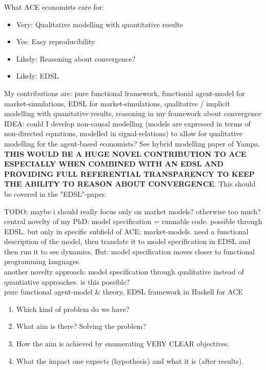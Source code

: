 What ACE economists care for:

\begin{itemize}
\item Very: Qualitative modelling with quantitative results
\item Yes: Easy reproducibility
\item Likely: Reasoning about convergence?
\item Likely: EDSL
\end{itemize}

My contributions are: pure functional framework, functional agent-model for market-simulations, EDSL for market-simulations, qualitative / implicit modelling with quanitative results, reasoning in my framework about convergence \\

IDEA: could I develop non-causal modelling (models are expressed in terms of non-directed equations, modelled in signal-relations) to allow for qualitative modelling for the agent-based economists? See hybrid modelling paper of Yampa. \textbf{THIS WOULD BE A HUGE NOVEL CONTRIBUTION TO ACE ESPECIALLY WHEN COMBINED WITH AN EDSL AND PROVIDING FULL REFERENTIAL TRANSPARENCY TO KEEP THE ABILITY TO REASON ABOUT CONVERGENCE}. This should be covered in the "EDSL"-paper.

TODO: maybe i should really focus only on market models? otherwise too much? \\

central novelty of my PhD: model specification = runnable code. possible through EDSL. but only in specific subfield of ACE: market-models. need a functional description of the model, then translate it to model specification in EDSL and then run it to see dynamics. But: model specification moves closer to functional programming languages. \\

another novelty approach: model specification through qualitative instead of quantiative approaches. is this possible? \\



pure functional agent-model \& theory, EDSL framework in Haskell for ACE

\begin{enumerate}
\item Which kind of problem do we have?
\item What aim is there? Solving the problem? 
\item How the aim is achieved by enumerating VERY CLEAR objectives.
\item What the impact one expects (hypothesis) and what it is (after results).
\end{enumerate}

